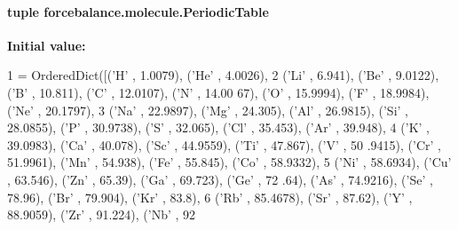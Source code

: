 \hypertarget{namespaceforcebalance_1_1molecule_adc5040ec456762f2ac240fb08febbfdd}{
\paragraph[{Periodic\-Table}]{\setlength{\rightskip}{0pt plus 5cm}tuple forcebalance.\-molecule.\-Periodic\-Table}}\label{namespaceforcebalance_1_1molecule_adc5040ec456762f2ac240fb08febbfdd}
{\bfseries Initial value\-:}
\begin{DoxyCode}
1 = OrderedDict([(\textcolor{stringliteral}{'H'} , 1.0079), (\textcolor{stringliteral}{'He'} , 4.0026), 
2                              (\textcolor{stringliteral}{'Li'} , 6.941), (\textcolor{stringliteral}{'Be'} , 9.0122), (\textcolor{stringliteral}{'B'} , 10.811), (\textcolor{stringliteral}{'C'} , 12.0107), (\textcolor{stringliteral}{'N'} , 14.00
      67), (\textcolor{stringliteral}{'O'} , 15.9994), (\textcolor{stringliteral}{'F'} , 18.9984), (\textcolor{stringliteral}{'Ne'} , 20.1797),
3                              (\textcolor{stringliteral}{'Na'} , 22.9897), (\textcolor{stringliteral}{'Mg'} , 24.305), (\textcolor{stringliteral}{'Al'} , 26.9815), (\textcolor{stringliteral}{'Si'} , 28.0855), (\textcolor{stringliteral}{'P'} , 
      30.9738), (\textcolor{stringliteral}{'S'} , 32.065), (\textcolor{stringliteral}{'Cl'} , 35.453), (\textcolor{stringliteral}{'Ar'} , 39.948), 
4                              (\textcolor{stringliteral}{'K'} , 39.0983), (\textcolor{stringliteral}{'Ca'} , 40.078), (\textcolor{stringliteral}{'Sc'} , 44.9559), (\textcolor{stringliteral}{'Ti'} , 47.867), (\textcolor{stringliteral}{'V'} , 50
      .9415), (\textcolor{stringliteral}{'Cr'} , 51.9961), (\textcolor{stringliteral}{'Mn'} , 54.938), (\textcolor{stringliteral}{'Fe'} , 55.845), (\textcolor{stringliteral}{'Co'} , 58.9332), 
5                              (\textcolor{stringliteral}{'Ni'} , 58.6934), (\textcolor{stringliteral}{'Cu'} , 63.546), (\textcolor{stringliteral}{'Zn'} , 65.39), (\textcolor{stringliteral}{'Ga'} , 69.723), (\textcolor{stringliteral}{'Ge'} , 72
      .64), (\textcolor{stringliteral}{'As'} , 74.9216), (\textcolor{stringliteral}{'Se'} , 78.96), (\textcolor{stringliteral}{'Br'} , 79.904), (\textcolor{stringliteral}{'Kr'} , 83.8), 
6                              (\textcolor{stringliteral}{'Rb'} , 85.4678), (\textcolor{stringliteral}{'Sr'} , 87.62), (\textcolor{stringliteral}{'Y'} , 88.9059), (\textcolor{stringliteral}{'Zr'} , 91.224), (\textcolor{stringliteral}{'Nb'} , 92

\end{DoxyCode}

